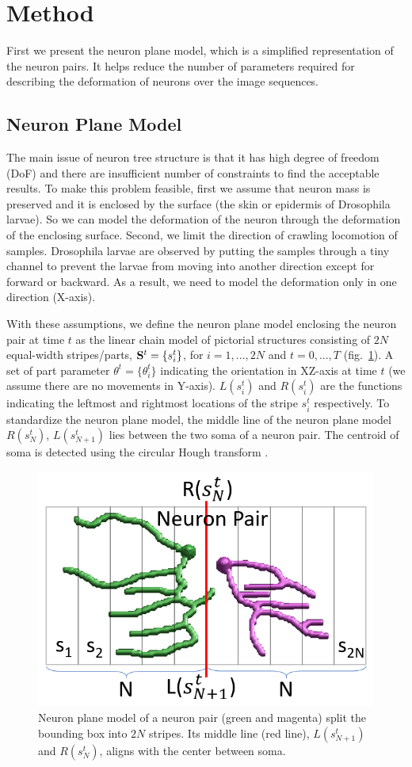 \documentclass[10pt,letterpaper]{article}
\begin{document}
\section{Method}
First we present the neuron plane model, which is a simplified representation of the neuron pairs. It helps reduce the number of parameters required for describing the deformation of neurons over the image sequences. 


\subsection{Neuron Plane Model}
The main issue of neuron tree structure is that it has high degree of freedom (DoF) and there are insufficient number of constraints to find the acceptable results. To make this problem feasible, first we assume that neuron mass is preserved and it is enclosed by the surface (the skin or epidermis of Drosophila larvae). So we can model the deformation of the neuron through the deformation of the enclosing surface.
Second, we limit the direction of crawling locomotion of samples. Drosophila larvae are observed by putting the samples through a tiny channel to prevent the larvae from moving into another direction except for forward or backward. As a result, we need to model the deformation only in one direction (X-axis).

With these assumptions, we define the neuron plane model enclosing the neuron pair at time $t$ as the linear chain model of pictorial structures \cite{Felzenszwalb2005} consisting of $2N$ equal-width stripes/parts, ${\bf S}^t = \{s_i^t\}$, for $i = 1,...,2N$ and $t = 0,...,T$ (fig.~\ref{fig:planemodel}). A set of part parameter $\theta^t = \{\theta_i^t\}$ indicating the orientation in XZ-axis at time $t$ (we assume there are no movements in Y-axis). $L(s_i^t)$ and $R(s_i^t)$ are the functions indicating the leftmost and rightmost locations of the stripe $s_i^t$ respectively. To standardize the neuron plane model, the middle line of the neuron plane model $R(s_N^t)$, $L(s_{N+1}^t)$ lies between the two soma of a neuron pair. The centroid of soma is detected using the circular Hough transform \cite{Duda1972}.

\begin{figure}
	\centering
	\includegraphics[width=0.4\linewidth]{img/plane_model}
	\caption{Neuron plane model of a neuron pair (green and magenta) split the bounding box into $2N$ stripes. Its middle line (red line), $L(s_{N+1}^t)$ and $R(s_N^t)$, aligns with the center between soma.}
	\label{fig:planemodel}
\end{figure}
\end{document}
